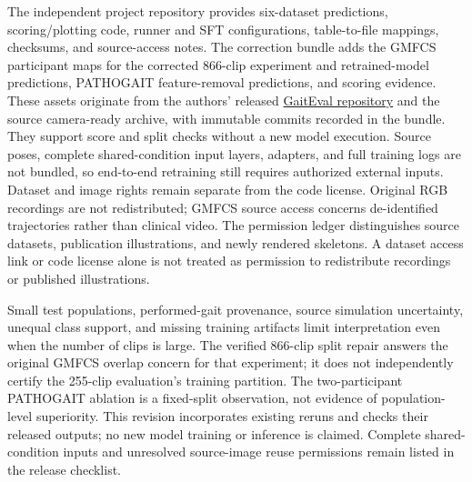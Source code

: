 The independent project repository provides six-dataset predictions, scoring/plotting code, runner and SFT configurations, table-to-file mappings, checksums, and source-access notes. The correction bundle adds the GMFCS participant maps for the corrected 866-clip experiment and retrained-model predictions, PATHOGAIT feature-removal predictions, and scoring evidence. These assets originate from the authors' released \href{https://github.com/gaiteval/GaitEval}{GaitEval repository} and the source camera-ready archive, with immutable commits recorded in the bundle. They support score and split checks without a new model execution. Source poses, complete shared-condition input layers, adapters, and full training logs are not bundled, so end-to-end retraining still requires authorized external inputs. Dataset and image rights remain separate from the code license. Original RGB recordings are not redistributed; GMFCS source access concerns de-identified trajectories rather than clinical video. The permission ledger distinguishes source datasets, publication illustrations, and newly rendered skeletons. A dataset access link or code license alone is not treated as permission to redistribute recordings or published illustrations.

Small test populations, performed-gait provenance, source simulation uncertainty, unequal class support, and missing training artifacts limit interpretation even when the number of clips is large. The verified 866-clip split repair answers the original GMFCS overlap concern for that experiment; it does not independently certify the 255-clip evaluation's training partition. The two-participant PATHOGAIT ablation is a fixed-split observation, not evidence of population-level superiority. This revision incorporates existing reruns and checks their released outputs; no new model training or inference is claimed. Complete shared-condition inputs and unresolved source-image reuse permissions remain listed in the release checklist.
